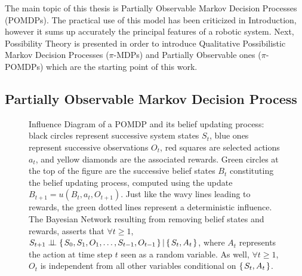 The main topic of this thesis is Partially Observable Markov Decision Processes (POMDPs).
The practical use of this model has been criticized in Introduction, 
however it sums up accurately the principal features of a robotic system.
Next, Possibility Theory is presented
in order to introduce Qualitative Possibilistic Markov Decision Processes ($\pi$-MDPs)
and Partially Observable ones ($\pi$-POMDPs) which are the starting point
of this work.

\subsection{Partially Observable Markov Decision Process} \label{section_POMDP}

\begin{figure}[!t]

\caption[Influence Diagram of a POMDP and its belief updating process]{
Influence Diagram of a POMDP and its belief updating process:
black circles represent successive system states $S_t$,
blue ones represent successive observations $O_t$,
red squares are selected actions $a_t$,
and yellow diamonds are the associated rewards.
Green circles at the top of the figure are the successive belief states 
$B_t$ constituting the belief updating process,
computed using the update $B_{t+1} = u(B_t,a_t,O_{t+1})$.
Just like the wavy lines leading to rewards, 
the green dotted lines represent a deterministic influence.
The Bayesian Network resulting from removing belief states and rewards, 
asserts that $\forall t \geqslant 1$, $S_{t+1} \perp\!\!\!\perp \left\{ \left.  S_{0},S_1, O_1, \ldots, S_{t-1}, O_{t-1}  \right. \right\} \vert \left\{ \left. S_t,A_t \right. \right\}$,
where $A_t$ represents the action at time step $t$ seen as a random variable.
As well, $\forall t \geqslant 1$, $O_{t}$ is independent from all other variables 
conditional on $\left\{ \left. S_t, A_t \right. \right\}$.}
\label{POMDP} 
\end{figure}

